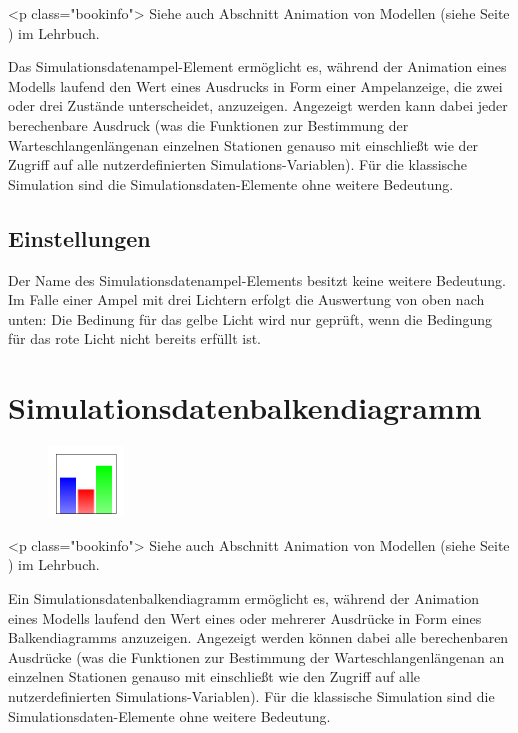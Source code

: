 <p class="bookinfo">
Siehe auch Abschnitt Animation von Modellen (siehe Seite \pageref{ref:book:5.4.3}) im Lehrbuch.

Das Simulationsdatenampel-Element ermöglicht es, während der Animation eines Modells laufend den Wert
eines Ausdrucks in Form einer Ampelanzeige, die zwei oder drei Zustände unterscheidet, anzuzeigen.
Angezeigt werden kann dabei jeder berechenbare Ausdruck (was die Funktionen zur Bestimmung der
Warteschlangenlängenan einzelnen Stationen genauso mit einschließt wie der Zugriff auf alle nutzerdefinierten
Simulations-Variablen). Für die klassische Simulation sind die Simulationsdaten-Elemente ohne weitere Bedeutung.

\subsection*{Einstellungen}

Der Name des Simulationsdatenampel-Elements besitzt keine weitere Bedeutung. Im Falle einer Ampel mit drei
Lichtern erfolgt die Auswertung von oben nach unten: Die Bedinung für das gelbe Licht wird nur geprüft,
wenn die Bedingung für das rote Licht nicht bereits erfüllt ist.


\section{Simulationsdatenbalkendiagramm}
\label{ref:ModelElementAnimationBarChart}

\begin{figure}
\vspace{-22pt}
\includegraphics[width=2cm]{imageModelElementAnimationBarChart.png}
\vspace{-22pt}
\end{figure}

<p class="bookinfo">
Siehe auch Abschnitt Animation von Modellen (siehe Seite \pageref{ref:book:5.4.3}) im Lehrbuch.

Ein Simulationsdatenbalkendiagramm ermöglicht es, während der Animation eines Modells laufend den Wert
eines oder mehrerer Ausdrücke in Form eines Balkendiagramms anzuzeigen.
Angezeigt werden können dabei alle berechenbaren Ausdrücke (was die Funktionen zur Bestimmung der
Warteschlangenlängenan an einzelnen Stationen genauso mit einschließt wie den Zugriff auf alle
nutzerdefinierten Simulations-Variablen). Für die klassische Simulation sind die
Simulationsdaten-Elemente ohne weitere Bedeutung.

